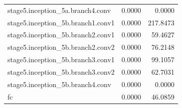 \begin{longtable}{lrr}
stage5.inception_5a.branch4.conv & 0.0000 & 0.0000 \\
stage5.inception_5b.branch1.conv1 & 0.0000 & 217.8473 \\
stage5.inception_5b.branch2.conv1 & 0.0000 & 59.4627 \\
stage5.inception_5b.branch2.conv2 & 0.0000 & 76.2148 \\
stage5.inception_5b.branch3.conv1 & 0.0000 & 99.1057 \\
stage5.inception_5b.branch3.conv2 & 0.0000 & 62.7031 \\
stage5.inception_5b.branch4.conv & 0.0000 & 0.0000 \\
fc & 0.0000 & 46.0859 \\
\end{longtable}
